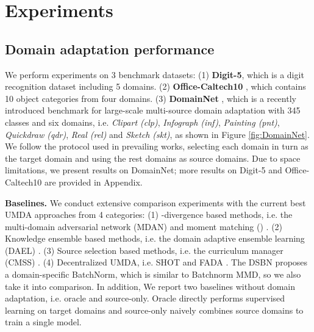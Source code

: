 \documentclass{article}
\begin{document}
\section{Experiments}
\subsection{Domain adaptation performance}
We perform experiments on 3 benchmark datasets: (1) \textbf{Digit-5}, which is a digit recognition dataset including 5 domains. (2) \textbf{Office-Caltech10} \citep{DBLP:conf/cvpr/GongSSG12}, which contains 10 object categories from four domains. (3) \textbf{DomainNet} \citep{DBLP:conf/iccv/PengBXHSW19}, which is a recently introduced benchmark for large-scale multi-source domain adaptation with 345 classes and six domains, i.e. \textit{Clipart (clp)}, \textit{Infograph (inf)}, \textit{Painting (pnt)}, \textit{Quickdraw (qdr)}, \textit{Real (rel)} and \textit{Sketch (skt)}, as shown in Figure \ref{fig:DomainNet}. We follow the protocol used in prevailing works, selecting each domain in turn as the target domain and using the rest domains as source domains. Due to space limitations, we present results on DomainNet; more results on Digit-5 and Office-Caltech10 are provided in Appendix.

\textbf{Baselines.} We conduct extensive comparison experiments with the current best UMDA approaches from 4 categories: (1) -divergence based methods, i.e. the multi-domain adversarial network (MDAN) \cite{DBLP:conf/iclr/0002ZWCMG18} and moment matching () \citep{DBLP:conf/iccv/PengBXHSW19}. (2) Knowledge ensemble based methods, i.e. the domain adaptive ensemble learning (DAEL) \cite{DBLP:journals/corr/abs-2003-07325}. (3) Source selection based methods, i.e. the curriculum manager (CMSS) \cite{DBLP:conf/eccv/YangBLS20}. (4) Decentralized UMDA, i.e. SHOT \citep{DBLP:conf/icml/LiangHF20} and FADA \citep{DBLP:conf/iclr/PengHZS20}. The DSBN proposes a domain-specific BatchNorm, which is similar to Batchnorm MMD, so we also take it into comparison. In addition, We report two baselines without domain adaptation, i.e. oracle and source-only. Oracle directly performs supervised learning on target domains and source-only naively combines source domains to train a single model. 
\end{document}

